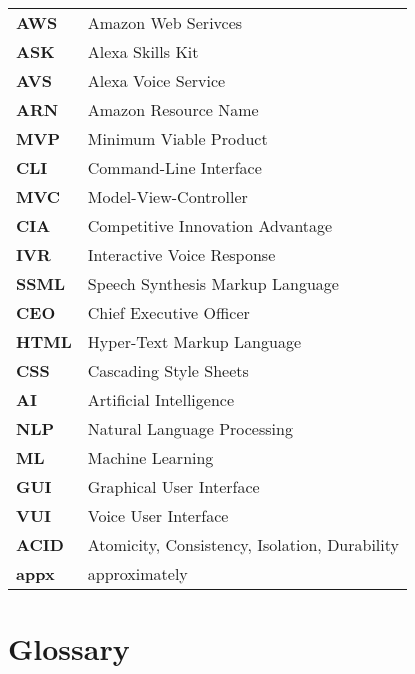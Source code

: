\begin{flushleft}
\begin{tabular}{ll}
\textbf{AWS}	&	Amazon Web Serivces\\
\textbf{ASK}	&	Alexa Skills Kit\\
\textbf{AVS}	&	Alexa Voice Service\\
\textbf{ARN}	&	Amazon Resource Name\\
\textbf{MVP}	&	Minimum Viable Product\\
\textbf{CLI}	&	Command-Line Interface\\
\textbf{MVC}	&	Model-View-Controller\\
\textbf{CIA}	&	Competitive Innovation Advantage\\
\textbf{IVR}	&	Interactive Voice Response\\
\textbf{SSML}	&	Speech Synthesis Markup Language\\
\textbf{CEO}	&	Chief Executive Officer\\
\textbf{HTML}	&	Hyper-Text Markup Language\\
\textbf{CSS}	&	Cascading Style Sheets\\
\textbf{AI}		&	Artificial Intelligence\\
\textbf{NLP}	&	Natural Language Processing\\
\textbf{ML}		&	Machine Learning\\
\textbf{GUI}	&	Graphical User Interface\\
\textbf{VUI}	&	Voice User Interface\\
\textbf{ACID}	&	Atomicity, Consistency, Isolation, Durability\\

\textbf{appx}	&	approximately\\
\end{tabular}
\end{flushleft}

\newpage
\section*{Glossary}
%

